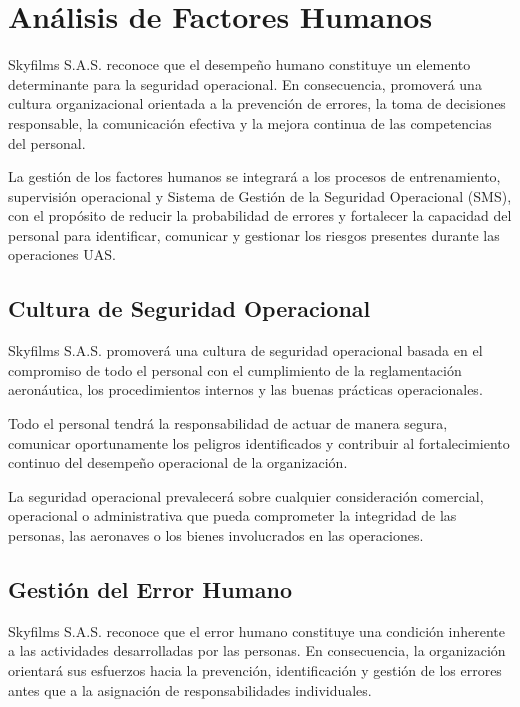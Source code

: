
\section{Análisis de Factores Humanos}

Skyfilms S.A.S. reconoce que el desempeño humano constituye un elemento determinante para la seguridad operacional. En consecuencia, promoverá una cultura organizacional orientada a la prevención de errores, la toma de decisiones responsable, la comunicación efectiva y la mejora continua de las competencias del personal.

La gestión de los factores humanos se integrará a los procesos de entrenamiento, supervisión operacional y Sistema de Gestión de la Seguridad Operacional (SMS), con el propósito de reducir la probabilidad de errores y fortalecer la capacidad del personal para identificar, comunicar y gestionar los riesgos presentes durante las operaciones UAS.

\subsection{Cultura de Seguridad Operacional}

Skyfilms S.A.S. promoverá una cultura de seguridad operacional basada en el compromiso de todo el personal con el cumplimiento de la reglamentación aeronáutica, los procedimientos internos y las buenas prácticas operacionales.

Todo el personal tendrá la responsabilidad de actuar de manera segura, comunicar oportunamente los peligros identificados y contribuir al fortalecimiento continuo del desempeño operacional de la organización.

La seguridad operacional prevalecerá sobre cualquier consideración comercial, operacional o administrativa que pueda comprometer la integridad de las personas, las aeronaves o los bienes involucrados en las operaciones.

\subsection{Gestión del Error Humano}

Skyfilms S.A.S. reconoce que el error humano constituye una condición inherente a las actividades desarrolladas por las personas. En consecuencia, la organización orientará sus esfuerzos hacia la prevención, identificación y gestión de los errores antes que a la asignación de responsabilidades individuales.


